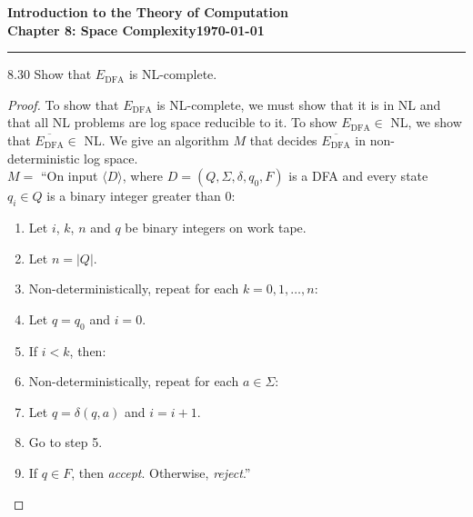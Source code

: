 \documentclass[11pt]{article}
\newcommand{\dated}{\today}
\begin{document}
\textbf{Introduction to the Theory of
Computation}\hfill\textbf{\myname}\\[0.01in]
\textbf{Chapter 8: Space Complexity}\hfill\textbf{\dated}\\
\smallskip\hrule\bigskip

\begin{problem}{8.30}
Show that $E_{\text{DFA}}$ is NL-complete.
\end{problem}

\begin{proof}
To show that $E_{\text{DFA}}$ is NL-complete, we must show that it is in NL and that all NL problems are log space reducible to it. To show $E_{\text{DFA}} \in$ NL, we show that $\overline{E_{\text{DFA}}} \in$ NL. We give an algorithm $M$ that decides $\overline{E_{\text{DFA}}}$ in non-deterministic log space. \\

$M =$ \textquotedblleft On input $\langle D \rangle$, where $D = (Q, \Sigma, \delta, q_0, F)$ is a DFA and every state $q_i \in Q$ is a binary integer greater than 0:
\begin{enumerate}
\item Let $i$, $k$, $n$ and $q$ be binary integers on work tape.
\item Let $n = |Q|$.
\item Non-deterministically, repeat for each $k = 0, 1, \dots, n$:
\item \hspace*{0.5cm} Let $q = q_0$ and $i = 0$.
\item \hspace*{0.5cm} If $i < k$, then:
\item \hspace*{1.0cm} Non-deterministically, repeat for each $a \in \Sigma$:
\item \hspace*{1.5cm} Let $q = \delta(q, a)$ and $i = i + 1$.
\item \hspace*{1.5cm} Go to step 5. 
\item \hspace*{0.5cm} If $q \in F$, then \textit{accept}. Otherwise, \textit{reject}.\textquotedblright
\end{enumerate}
\end{proof}
\end{document}
